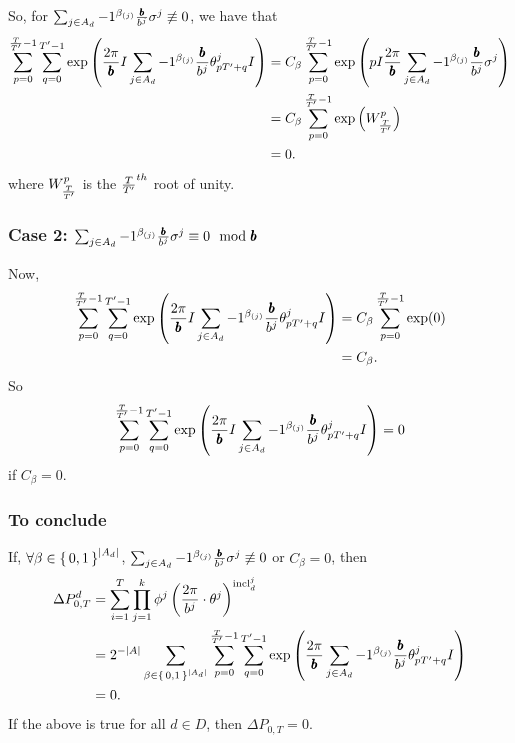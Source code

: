 So, for $\sum_{j \in A_d} -1 ^ {\beta_{(j)}}\frac{{\pmb{b}}}{b^j} \sigma^j \not\equiv 0$, we have that
\begin{align*}
  \sum_{p= 0}^{\frac{T}{{T}'} - 1} \sum_{q = 0}^{{T}' - 1} \exp\left( \frac{2\pi}{{\pmb{b}}} I \sum_{j \in A_d} -1 ^ {\beta_{(j)}} \frac{{\pmb{b}}}{b^j} {\theta^j_{p {T}' + q}}I \right) &= C_\beta \sum_{p= 0}^{\frac{T}{{T}'} - 1}
    \exp\left(
      pI \frac{2\pi}{{\pmb{b}}} \sum_{j \in A_d} -1 ^ {\beta_{(j)}}
      \frac{{\pmb{b}}}{b^j}
      \sigma^j
    \right) \\
    &= C_\beta \sum_{p = 0}^{\frac{T}{{T}'} - 1}\exp\left(W_{\frac{T}{{T}'}}^p\right) \\
    &= 0.
\end{align*}
where $W_{\frac{T}{{T}'}}^p$ is the $\frac{T}{{T}'}^{th}$ root of unity.

\subsubsection*{Case 2: $\sum_{j \in A_d} -1 ^ {\beta_{(j)}} \frac{{\pmb{b}}}{b^j} \sigma^j \equiv 0 \mod {{\pmb{b}}}$}
Now,
\begin{align*}
  \sum_{p= 0}^{\frac{T}{{T}'} - 1} \sum_{q = 0}^{{T}' - 1} \exp\left( \frac{2\pi}{{\pmb{b}}} I \sum_{j \in A_d} -1 ^ {\beta_{(j)}} \frac{{\pmb{b}}}{b^j} {\theta^j_{p {T}' + q}}I \right) &= C_\beta \sum_{p= 0}^{\frac{T}{{T}'} - 1} \exp(0) \\
  &= C_\beta.
\end{align*}
So $$\sum_{p= 0}^{\frac{T}{{T}'} - 1} \sum_{q = 0}^{{T}' - 1} \exp\left( \frac{2\pi}{{\pmb{b}}} I \sum_{j \in A_d} -1 ^ {\beta_{(j)}} \frac{{\pmb{b}}}{b^j} {\theta^j_{p {T}' + q}}I \right) = 0$$ if $C_\beta = 0$.

\subsubsection*{To conclude}
If, $\forall \beta \in \set{0, 1}^{|A_d|}$, $\sum_{j \in A_d} -1 ^ {\beta_{(j)}} \frac{{\pmb{b}}}{b^j} \sigma^j \not\equiv 0$
or $C_\beta = 0$, then
\begin{align*}
  \Delta P_{0, T}^d &= \sum_{i = 1}^T \prod_{j=1}^k \phi^j\left(\frac{2\pi}{b^j} \cdot \theta^j\right) ^ {{\mathrm{incl}_{d}^{j}}} \\&=  2^{-|A|}
  \sum_{\beta \in \set{0,1}^{|A_d|}} 
      \sum_{p= 0}^{\frac{T}{{T}'} - 1} \sum_{q = 0}^{{T}' - 1}
     \exp\left(
       \frac{2\pi}{{\pmb{b}}}
         \sum_{j \in A_d} -1 ^ {\beta_{(j)}}
         \frac{{\pmb{b}}}{b^j}
         {\theta^j_{p {T}' + q}}I
       \right) \\
        &= 0.
\end{align*}
If the above is true for all $d \in D$, then 
$\Delta P_{0, T} = 0$.
